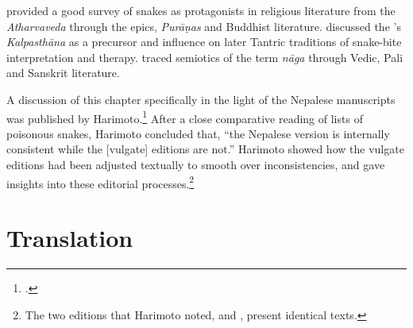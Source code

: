 \citet{doni-2015} provided a good survey of snakes as protagonists in
religious literature from the \emph{Atharvaveda} through the epics,
\emph{Purāṇas} and Buddhist literature. \citet[31--33 \emph{et
    passim}]{slou-2016} discussed the \SS's \emph{Kalpasthāna} as a precursor
and influence on later Tantric traditions of snake-bite interpretation
and therapy.  \citet{seme-1979} traced semiotics of the term \emph{nāga}
through Vedic, Pali and Sanskrit literature.
    
    
A discussion of this chapter specifically in the light of the Nepalese
manuscripts was published by Harimoto.\footcite[101--104]{hari-2011} After a
close comparative reading of lists of poisonous snakes, Harimoto concluded
that, “the Nepalese version is internally consistent while the [vulgate]
editions are not.”  Harimoto showed how the vulgate editions had been
adjusted textually to smooth over inconsistencies, and gave insights into
these editorial processes.\footnote{The two editions that Harimoto noted,
    \cite{vulgate} and \cite{bhat-1889}, present identical texts.}


\section{Translation}

